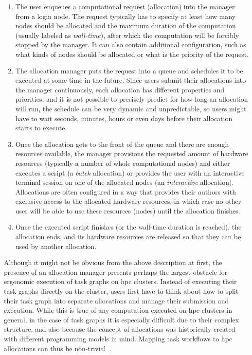\begin{enumerate}
	\item The user enqueues a computational request (allocation) into the manager from a login node. The
	      request typically has to specify at least how many nodes should be allocated and the maximum
	      duration of the computation (usually labeled as \emph{wall-time}), after which the
	      computation will be forcibly stopped by the manager. It can also contain additional configuration,
	      such as what kinds of nodes should be allocated or what is the priority of the request.
	\item The allocation manager puts the request into a queue and schedules it to be executed at some time
	      in the future. Since users submit their allocations into the manager continuously, each allocation
	      has different properties and priorities, and it is not possible to precisely predict for how long
	      an allocation will run, the schedule can be very dynamic and unpredictable, so users might have to
	      wait seconds, minutes, hours or even days before their allocation starts to execute.
	\item Once the allocation gets to the front of the queue and there are enough resources available, the
	      manager provisions the requested amount of hardware resources (typically a number of whole
	      computational nodes) and either executes a script (a \emph{batch} allocation) or provides
	      the user with an interactive terminal session on one of the allocated nodes (an
	      \emph{interactive} allocation). Allocations are often configured in a way that provides their
	      authors with exclusive access to the allocated hardware resources, in which case no other user will
	      be able to use these resources (nodes) until the allocation finishes.
	\item Once the executed script finishes (or the wall-time duration is reached), the allocation ends, and
	      its hardware resources are released so that they can be used by another allocation.
\end{enumerate}

Although it might not be obvious from the above description at first, the presence of an allocation
manager presents perhaps the largest obstacle for ergonomic execution of task graphs on
\gls{hpc} clusters. Instead of executing their task graphs directly on the cluster,
users first have to think about how to split their task graph into separate allocations and manage
their submission and execution. While this is true of any computation executed on
\gls{hpc} clusters in general, in the case of task graphs it is especially difficult
due to their complex structure, and also because the concept of allocations was historically
created with different programming models in mind. Mapping task workflows to
\gls{hpc} allocations can thus be non-trivial~\cite{glume,slurm-workflow}.

